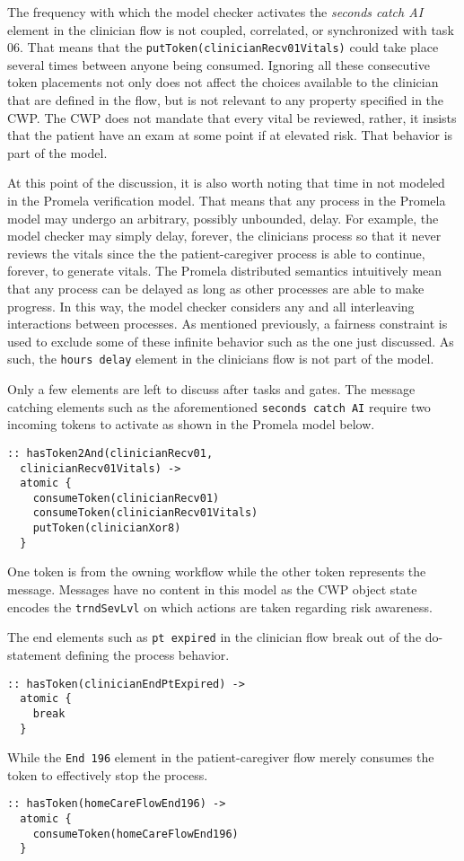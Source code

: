 The frequency with which the model checker activates the \emph{seconds catch AI} element in the clinician flow is not coupled, correlated, or synchronized with task 06. That means that the \texttt{putToken(clinicianRecv01Vitals)} could take place several times between anyone being consumed. Ignoring all these consecutive token placements not only does not affect the choices available to the clinician that are defined in the flow, but is not relevant to any property specified in the CWP. The CWP does not mandate that every vital be reviewed, rather, it insists that the patient have an exam at some point if at elevated risk. That behavior is part of the model.

At this point of the discussion, it is also worth noting that time in not modeled in the Promela verification model. That means that any process in the Promela model may undergo an arbitrary, possibly unbounded, delay. For example, the model checker may simply delay, forever, the clinicians process so that it never reviews the vitals since the the patient-caregiver process is able to continue, forever, to generate vitals. The Promela distributed semantics intuitively mean that any process can be delayed as long as other processes are able to make progress. In this way, the model checker considers any and all interleaving interactions between processes. As mentioned previously, a fairness constraint is used to exclude some of these infinite behavior such as the one just discussed. As such, the \texttt{hours delay} element in the clinicians flow is not part of the model.

Only a few elements are left to discuss after tasks and gates. The message catching elements such as the aforementioned \texttt{seconds catch AI} require two incoming tokens to activate as shown in the Promela model below.
%
{\small
\begin{lstlisting}[style=myPromela]
:: hasToken2And(clinicianRecv01, 
  clinicianRecv01Vitals) ->
  atomic {
    consumeToken(clinicianRecv01)
    consumeToken(clinicianRecv01Vitals)
    putToken(clinicianXor8)
  }
\end{lstlisting}
}
%
\noindent One token is from the owning workflow while the other token represents the message. Messages have no content in this model as the CWP object state encodes the \texttt{trndSevLvl} on which actions are taken regarding risk awareness.

The end elements such as \texttt{pt expired} in the clinician flow break out of the do-statement defining the process behavior.
%
{\small
\begin{lstlisting}[style=myPromela]
:: hasToken(clinicianEndPtExpired) ->
  atomic {
    break
  }
\end{lstlisting}
}
%
\noindent While the \texttt{End 196} element in the patient-caregiver flow merely consumes the token to effectively stop the process.
%
{\small
\begin{lstlisting}[style=myPromela]
:: hasToken(homeCareFlowEnd196) ->
  atomic {
    consumeToken(homeCareFlowEnd196)
  }
\end{lstlisting}
}
% 

